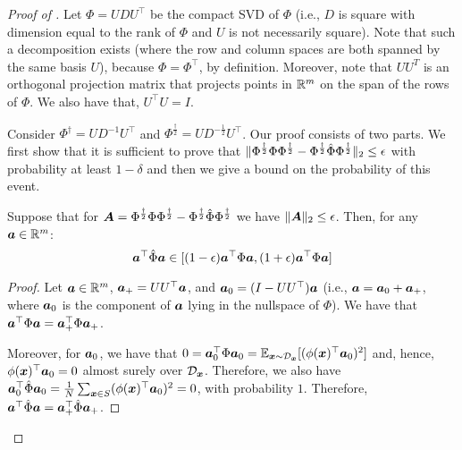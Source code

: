 \begin{proof}[Proof of ]
    Let $\Phi = UDU^\top$ be the compact SVD of $\Phi$ (i.e., $D$ is square with dimension equal to the rank of $\Phi$ and $U$ is not necessarily square). Note that such a decomposition exists (where the row and column spaces are both spanned by the same basis $U$), because $\Phi = \Phi^\top$, by definition. Moreover, note that $UU^T$ is an orthogonal projection matrix that projects points in $\mathbb{R}^m$ on the span of the rows of $\Phi$. We also have that, $U^\top U = I$.

    \newcommand{\Phihalfinv}{\Phi^{\frac{\dagger}{2}}}

    Consider $\Phi^\dagger = UD^{-1}U^\top$ and $\Phihalfinv = UD^{-\frac{1}{2}}U^\top$. Our proof consists of two parts. We first show that it is sufficient to prove that $\|\Phihalfinv\Phi\Phihalfinv - \Phihalfinv\hat\Phi\Phihalfinv\|_2 \le \eps$ with probability at least $1-\delta$ and then we give a bound on the probability of this event.

    \begin{claim}
        Suppose that for $\mA = \Phihalfinv\Phi\Phihalfinv - \Phihalfinv\hat\Phi\Phihalfinv$ we have $\|{\bm{A}}\|_2 \le {\epsilon}$. Then, for any ${\bm{a}}\in\mathbb{R}^m$: 
        \[ 
            {\bm{a}}^\top \hat\Phi {\bm{a}} \in [{(1-{\epsilon})} {\bm{a}}^\top \Phi{\bm{a}}, (1+{\epsilon}){\bm{a}}^\top \Phi{\bm{a}}]
        \]
    \end{claim}
    \begin{proof}
        Let ${\bm{a}} \in \mathbb{R}^m$, ${\bm{a}}_+ = UU^\top {\bm{a}}$, and ${\bm{a}}_0 = (I-UU^\top) {\bm{a}}$ (i.e., ${\bm{a}} = {\bm{a}}_0 + {\bm{a}}_+$, where ${\bm{a}}_0$ is the component of ${\bm{a}}$ lying in the nullspace of $\Phi$). We have that ${\bm{a}}^\top \Phi {\bm{a}} = {\bm{a}}^\top_+ \Phi {\bm{a}}_+$.

        Moreover, for ${\bm{a}}_0$, we have that $0={\bm{a}}_0^\top \Phi {\bm{a}}_0 = \mathbb{E}_{{\bm{x}}\sim {\mathcal{D}}_{{\bm{x}}}}[(\phi({\bm{x}})^\top {\bm{a}}_0)^2]$ and, hence, $\phi({\bm{x}})^\top {\bm{a}}_0 = 0$ almost surely over ${\mathcal{D}}_{{\bm{x}}}$. Therefore, we also have ${\bm{a}}_0^\top \hat\Phi {\bm{a}}_0 = \frac{1}{N}\sum_{{\bm{x}}\in S}(\phi({\bm{x}})^\top {\bm{a}}_0)^2 = 0$, with probability $1$. Therefore, ${\bm{a}}^\top \hat\Phi {\bm{a}} = {\bm{a}}_+^\top \hat\Phi {\bm{a}}_+$. 


\end{proof}
\end{proof}
